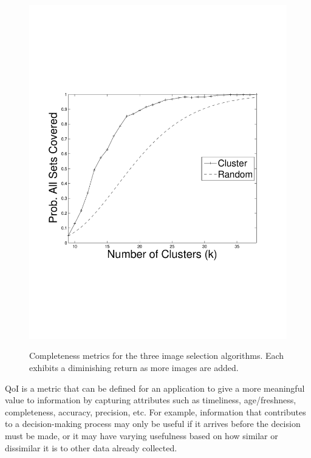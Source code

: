 \begin{figure}
{        \includegraphics[clip=true, trim = 16mm 65mm 25mm 70mm, scale=0.23]{perc_all_sets_covered_vary_k.pdf}
        \label{fig:clusterAvgNumSetsCov}
        }
        
        \vspace{-1mm}
   \caption{Completeness metrics for the three image selection algorithms. Each exhibits a diminishing return as more images are added.}
   \label{fig:completeness_exp_results}
   \vspace{-6mm}
\end{figure}

QoI is a metric that can be defined for an application to give a more meaningful value to information by capturing attributes such as  timeliness, age/freshness, completeness, accuracy, precision, etc.  
For example, information that contributes to a decision-making process may only be useful if it arrives before the decision must be made, or it may have varying usefulness based on how similar or dissimilar it is to other data already collected.

